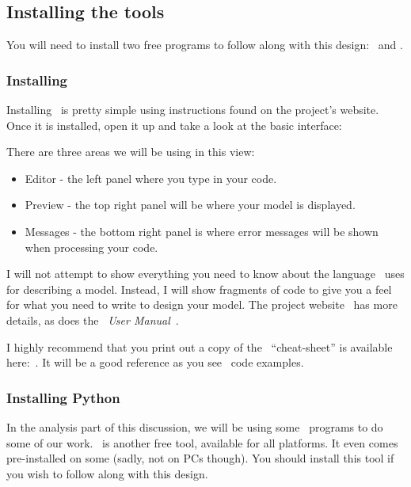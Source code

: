 \subsection{Installing the tools}

You will need to install two free programs to follow along with this design: \osc\ and \PY.

\subsubsection{Installing \osc}

Installing \osc\ is pretty simple using instructions found on the project's
website. Once it is installed, open it up and take a look at the basic
interface:


There are three areas we will be using in this view:

\begin{itemize}
\item{Editor - the left panel where you type in your code.}
\item{Preview - the top right panel will be where your model is displayed.}
\item{Messages - the bottom right panel is where error messages will be shown
when processing your code.}
\end{itemize}

I will not attempt to show everything you need to know about the language \osc\
uses for describing a model. Instead, I will show fragments of code to give you
a feel for what you need to write to design your model. The project
website~\cite{blackr} has more details, as does the \osc\ {\it User
Manual}~\cite{userman}.

I highly recommend that you  print out a copy of the \osc\
``cheat-sheet'' is available here:~\cite{osccheat}. It will be a good reference
as you see \osc\ code examples.

\subsubsection{Installing Python}

In the analysis part of this discussion, we will be using some \PY\ programs to
do some of our work. \PY\ is another free tool, available for all platforms. It
even comes pre-installed on some (sadly, not on PCs though). You should install
this tool if you wish to follow along with this design.

